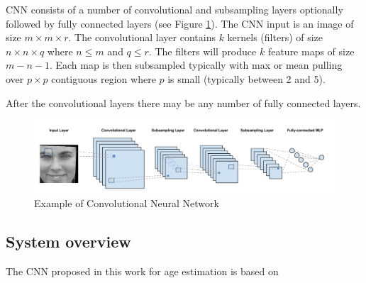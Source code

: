 CNN consists of a number of convolutional and subsampling layers optionally followed by fully connected layers (see Figure \ref{fig:cnnSample}). The CNN input is an image of size $m\times m\times r$. The convolutional layer contains $k$ kernels (filters) of size $n\times n\times q$ where $n \leq m$ and $q \leq r$. The filters will produce $k$ feature maps of size $m - n - 1 $. Each map is then subsampled typically with max or mean pulling over $p\times p$ contiguous region where $p$ is small (typically between 2 and 5).

After the convolutional layers there may be any number of fully connected layers.

\begin{figure}[!h]
	\centering
	\includegraphics[width=\textwidth]{figures/CNN_sample}
	\caption{Example of Convolutional Neural Network}
	\label{fig:cnnSample}
\end{figure}

\subsection{System overview}

The CNN proposed in this work for age estimation is based on \cite{yiage} \cite{yan2014}








